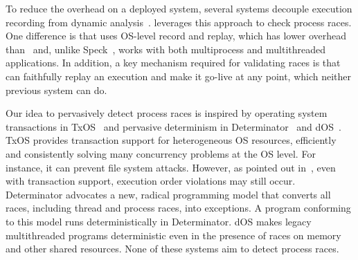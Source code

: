 To reduce the overhead on a deployed system, several systems decouple
execution recording from dynamic
analysis~\cite{decouple:usenix08,speck:asplos08}.  \racepro leverages this
approach to check process races.  One difference is that \racepro uses
OS-level record and replay, which has lower overhead
than~\cite{decouple:usenix08} and, unlike Speck~\cite{speck:asplos08},
\racepro works with both multiprocess and multithreaded applications. In addition, 
a key mechanism required for validating races is that \racepro can faithfully
replay an execution and make it go-live at any point, 
which neither previous system can do.

  Our idea to
pervasively detect process races is inspired by operating system
transactions in TxOS~\cite{txos:sosp09} and pervasive determinism in
Determinator~\cite{determinator:osdi10} and dOS~\cite{dos:osdi10}.  TxOS
provides transaction support for heterogeneous OS resources, efficiently
and consistently solving many concurrency problems at the OS level.  For
instance, it can prevent file system \toctou attacks.  However, as pointed
out in~\cite{lu:concurrency-bugs}, even with transaction support,
execution order violations may still occur.  Determinator advocates a
new, radical programming model that converts all races, including thread
and process races, into exceptions.  A program conforming to this model
runs deterministically in Determinator.  dOS makes legacy multithreaded
programs deterministic even in the presence of races on memory and other
shared resources.  None of these systems aim to detect process races.
